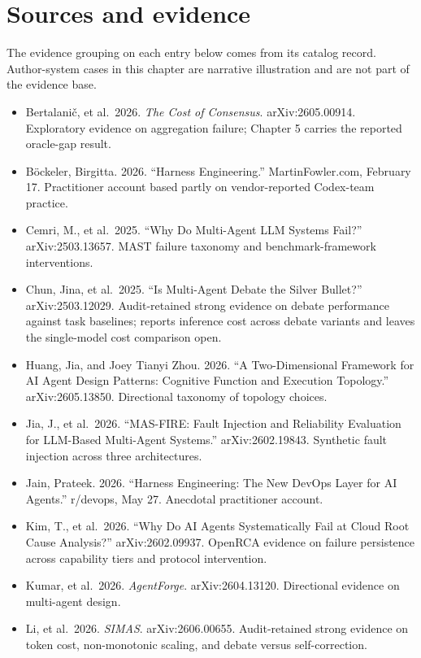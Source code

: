 \section*{Sources and evidence}

The evidence grouping on each entry below comes from its catalog record. Author-system cases in this chapter are narrative illustration and are not part of the evidence base.

\begin{itemize}
\tightlist
\item
  Bertalani\v{c}, et al.~2026. \emph{The Cost of Consensus}. arXiv:2605.00914. Exploratory evidence on aggregation failure; Chapter 5 carries the reported oracle-gap result.
\item
  Böckeler, Birgitta. 2026. ``Harness Engineering.'' MartinFowler.com, February 17. Practitioner account based partly on vendor-reported Codex-team practice.
\item
  Cemri, M., et al.~2025. ``Why Do Multi-Agent LLM Systems Fail?'' arXiv:2503.13657. MAST failure taxonomy and benchmark-framework interventions.
\item
  Chun, Jina, et al.~2025. ``Is Multi-Agent Debate the Silver Bullet?'' arXiv:2503.12029. Audit-retained strong evidence on debate performance against task baselines; reports inference cost across debate variants and leaves the single-model cost comparison open.
\item
  Huang, Jia, and Joey Tianyi Zhou. 2026. ``A Two-Dimensional Framework for AI Agent Design Patterns: Cognitive Function and Execution Topology.'' arXiv:2605.13850. Directional taxonomy of topology choices.
\item
  Jia, J., et al.~2026. ``MAS-FIRE: Fault Injection and Reliability Evaluation for LLM-Based Multi-Agent Systems.'' arXiv:2602.19843. Synthetic fault injection across three architectures.
\item
  Jain, Prateek. 2026. ``Harness Engineering: The New DevOps Layer for AI Agents.'' r/devops, May 27. Anecdotal practitioner account.
\item
  Kim, T., et al.~2026. ``Why Do AI Agents Systematically Fail at Cloud Root Cause Analysis?'' arXiv:2602.09937. OpenRCA evidence on failure persistence across capability tiers and protocol intervention.
\item
  Kumar, et al.~2026. \emph{AgentForge}. arXiv:2604.13120. Directional evidence on multi-agent design.
\item
  Li, et al.~2026. \emph{SIMAS}. arXiv:2606.00655. Audit-retained strong evidence on token cost, non-monotonic scaling, and debate versus self-correction.

\end{itemize}
